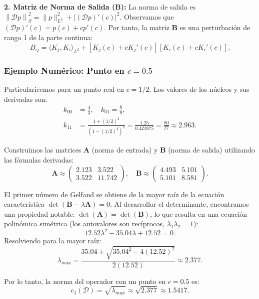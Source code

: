 \documentclass[12pt,a4paper]{article}
\theoremstyle{definition}
\theoremstyle{remark}
\newcommand{\norm}[1]{\left\| #1 \right\|_S}
\newcommand{\abs}[1]{\left| #1 \right|}
\newcommand{\D}{\mathcal{D}}
\begin{document}
\textbf{2. Matriz de Norma de Salida ($\mathbf{B}$):}
La norma de salida es $\norm{\D p}^2 = \|p\|_{L^2}^2 + \abs{(\D p)'(c)}^2$. Observamos que $(\D p)'(c) = p(c) + c p'(c)$. Por tanto, la matriz $\mathbf{B}$ es una perturbación de rango 1 de la parte continua:
$$ B_{ij} = \langle K_j, K_i \rangle_{L^2} + [K_j(c) + c K_j'(c)] \overline{[K_i(c) + c K_i'(c)]}. $$

\subsubsection{Ejemplo Numérico: Punto en $c = 0.5$}

Particularicemos para un punto real en $c=1/2$. Los valores de los núcleos y sus derivadas son:
\begin{align*}
    k_{00} & = \frac{4}{3}, \quad k_{01} = \frac{8}{9},                                               \\
    k_{11} & = \frac{1+(1/2)^2}{(1-(1/2)^2)^3} = \frac{1.25}{0.421875} = \frac{80}{27} \approx 2.963.
\end{align*}

Construimos las matrices $\mathbf{A}$ (norma de entrada) y $\mathbf{B}$ (norma de salida) utilizando las fórmulas derivadas:
\begin{equation}
    \mathbf{A} \approx \begin{pmatrix} 2.123 & 3.522 \\ 3.522 & 11.742 \end{pmatrix}, \quad
    \mathbf{B} \approx \begin{pmatrix} 4.493 & 5.101 \\ 5.101 & 8.581 \end{pmatrix}.
\end{equation}

El primer número de Gelfand se obtiene de la mayor raíz de la ecuación característica $\det(\mathbf{B} - \lambda \mathbf{A}) = 0$. Al desarrollar el determinante, encontramos una propiedad notable: $\det(\mathbf{A}) = \det(\mathbf{B})$, lo que resulta en una ecuación polinómica simétrica (los autovalores son recíprocos, $\lambda_1 \lambda_2 = 1$):
\begin{equation}
    12.52 \lambda^2 - 35.04 \lambda + 12.52 = 0.
\end{equation}
Resolviendo para la mayor raíz:
$$ \lambda_{max} = \frac{35.04 + \sqrt{35.04^2 - 4(12.52)^2}}{2(12.52)} \approx 2.377. $$

Por lo tanto, la norma del operador con un punto en $c=0.5$ es:
\begin{equation}
    c_1(\D) = \sqrt{\lambda_{max}} \approx \sqrt{2.377} \approx 1.5417.
\end{equation}
\end{document}
